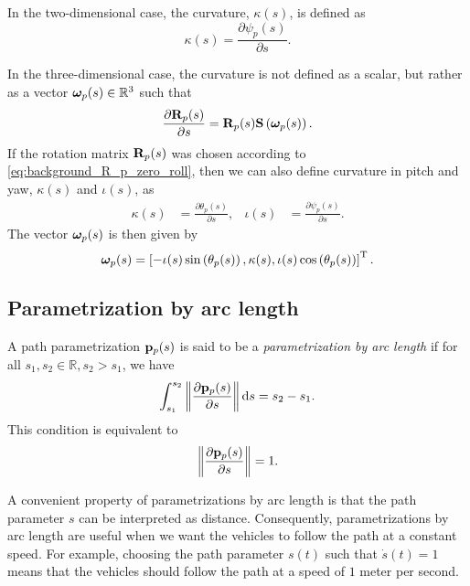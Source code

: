 In the two-dimensional case, the curvature, $\kappa(s)$, is defined as
\begin{equation}
    \kappa(s) = \frac{\partial \psi_{p}(s)}{\partial s}.
\end{equation}

In the three-dimensional case, the curvature is not defined as a scalar, but rather as a vector $\bm{\omega}_p(s) \in \mathbb{R}^3$ such that
\begin{equation}
    \frac{\partial \mathbf{R}_p(s)}{\partial s} = \mathbf{R}_p(s) \mathbf{S}\left(\bm{\omega}_p(s)\right).
\end{equation}
If the rotation matrix $\mathbf{R}_p(s)$ was chosen according to \eqref{eq:background_R_p_zero_roll}, then we can also define curvature in pitch and yaw, $\kappa(s)$ and $\iota(s)$, as
\begin{align}
    \kappa(s) &= \frac{\partial \theta_{p}(s)}{\partial s}, &
    \iota(s) &= \frac{\partial \psi_{p}(s)}{\partial s}.
\end{align}
The vector $\bm{\omega}_p(s)$ is then given by
\begin{equation}
    \bm{\omega}_p(s) = \left[-\iota(s)\sin\left(\theta_{p}(s)\right), \kappa(s), \iota(s)\cos\left(\theta_{p}(s)\right)\right]^{\mathrm{T}}.
\end{equation}

\subsection{Parametrization by arc length}
A path parametrization $\mathbf{p}_p(s)$ is said to be a \emph{parametrization by arc length} if for all $s_1, s_2 \in \mathbb{R}, s_2 > s_1$, we have
\begin{equation}
    \int_{s_1}^{s_2} \left\|\frac{\partial \mathbf{p}_p(s)}{\partial s}\right\| {\rm d}s = s_2 - s_1.
\end{equation}
This condition is equivalent to
\begin{equation}
    \left\|\frac{\partial \mathbf{p}_p(s)}{\partial s}\right\| = 1.
\end{equation}

A convenient property of parametrizations by arc length is that the path parameter $s$ can be interpreted as distance.
Consequently, parametrizations by arc length are useful when we want the vehicles to follow the path at a constant speed.
For example, choosing the path parameter $s(t)$ such that $\dot{s}(t) = 1$ means that the vehicles should follow the path at a speed of $1$ meter per second.

